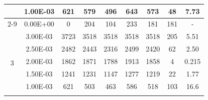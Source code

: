 \begin{table}[H]
{\begin{tabular}{|c|c|c|c|c|c|c|c|c|}
                               & 1.00E-03         & 621       & 579                                                        & 496                                                       & 643                                                       & 573     & 48     & 7.73                                                               \\ \cline{2-9}
                               & 0.00E+00         & 0         & 204                                                        & 104                                                       & 233                                                       & 181     & 181    & -                                                                  \\ \hline
            \multirow{6}{*}{3} & 3.00E-03         & 3723      & 3518                                                       & 3518                                                      & 3518                                                      & 3518    & 205    & 5.51                                                               \\ \cline{2-9}
                               & 2.50E-03         & 2482      & 2443                                                       & 2316                                                      & 2499                                                      & 2420    & 62     & 2.50                                                               \\ \cline{2-9}
                               & 2.00E-03         & 1862      & 1871                                                       & 1788                                                      & 1913                                                      & 1858    & 4      & 0.215                                                              \\ \cline{2-9}
                               & 1.50E-03         & 1241      & 1231                                                       & 1147                                                      & 1277                                                      & 1219    & 22     & 1.77                                                               \\ \cline{2-9}
                               & 1.00E-03         & 621       & 503                                                        & 463                                                       & 586                                                       & 518     & 103    & 16.6                                                               \\ \cline{2-9}

\end{tabular}}
\end{table}
